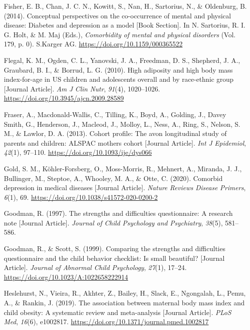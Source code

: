 \documentclass[
  letterpaper,
  DIV=11,
  numbers=noendperiod]{scrreport}
\newlength{\cslhangindent}
\newenvironment{CSLReferences}[2] %
 {\begin{list}{}{%
  \setlength{\itemindent}{0pt}
  \setlength{\leftmargin}{0pt}
  \setlength{\parsep}{0pt}
  \ifodd #1
   \setlength{\leftmargin}{\cslhangindent}
   \setlength{\itemindent}{-1\cslhangindent}
  \fi
  \setlength{\itemsep}{#2\baselineskip}}}
 {\end{list}}
\begin{document}
\begin{CSLReferences}{1}{0}
Fisher, E. B., Chan, J. C. N., Kowitt, S., Nan, H., Sartorius, N., \&
Oldenburg, B. (2014). Conceptual perspectives on the co-occurrence of
mental and physical disease: Diabetes and depression as a model {[}Book
Section{]}. In N. Sartorius, R. I. G. Holt, \& M. Maj (Eds.),
\emph{Comorbidity of mental and physical disorders} (Vol. 179, p. 0).
S.Karger AG. \url{https://doi.org/10.1159/000365522}

Flegal, K. M., Ogden, C. L., Yanovski, J. A., Freedman, D. S., Shepherd,
J. A., Graubard, B. I., \& Borrud, L. G. (2010). High adiposity and high
body mass index-for-age in US children and adolescents overall and by
race-ethnic group {[}Journal Article{]}. \emph{Am J Clin Nutr},
\emph{91}(4), 1020--1026. \url{https://doi.org/10.3945/ajcn.2009.28589}

Fraser, A., Macdonald-Wallis, C., Tilling, K., Boyd, A., Golding, J.,
Davey Smith, G., Henderson, J., Macleod, J., Molloy, L., Ness, A., Ring,
S., Nelson, S. M., \& Lawlor, D. A. (2013). Cohort profile: The avon
longitudinal study of parents and children: ALSPAC mothers cohort
{[}Journal Article{]}. \emph{Int J Epidemiol}, \emph{42}(1), 97--110.
\url{https://doi.org/10.1093/ije/dys066}

Gold, S. M., Köhler-Forsberg, O., Moss-Morris, R., Mehnert, A., Miranda,
J. J., Bullinger, M., Steptoe, A., Whooley, M. A., \& Otte, C. (2020).
Comorbid depression in medical diseases {[}Journal Article{]}.
\emph{Nature Reviews Disease Primers}, \emph{6}(1), 69.
\url{https://doi.org/10.1038/s41572-020-0200-2}

Goodman, R. (1997). The strengths and difficulties questionnaire: A
research note {[}Journal Article{]}. \emph{Journal of Child Psychology
and Psychiatry}, \emph{38}(5), 581--586.

Goodman, R., \& Scott, S. (1999). Comparing the strengths and
difficulties questionnaire and the child behavior checklist: Is small
beautiful? {[}Journal Article{]}. \emph{Journal of Abnormal Child
Psychology}, \emph{27}(1), 17--24.
\url{https://doi.org/10.1023/A:1022658222914}

Heslehurst, N., Vieira, R., Akhter, Z., Bailey, H., Slack, E.,
Ngongalah, L., Pemu, A., \& Rankin, J. (2019). The association between
maternal body mass index and child obesity: A systematic review and
meta-analysis {[}Journal Article{]}. \emph{PLoS Med}, \emph{16}(6),
e1002817. \url{https://doi.org/10.1371/journal.pmed.1002817}


\end{CSLReferences}
\end{document}
